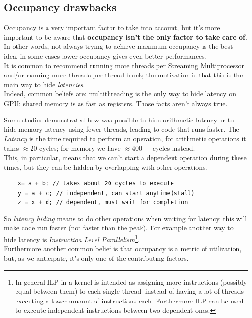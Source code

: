 \subsection{Occupancy drawbacks}
Occupancy is a very important factor to take into account, but it's more important to be aware that \textbf{occupancy isn't the only factor to take care of}.\\
In other words, not always trying to achieve maximum occupancy is the best idea, in some cases lower occupancy gives even better performances.\\
It is common to recommend running more threads per Streaming Multiprocessor and/or running more threads per thread block; the motivation is that this is the main way to hide \textit{latencies}.\\
Indeed, common beliefs are: multithreading is the only way to hide latency on GPU; shared memory is as fast as registers. Those facts aren't always true.

Some studies demonstrated how was possible to hide arithmetic latency or to hide memory latency using fewer threads, leading to code that runs faster.
The \textit{Latency} is the time required to perform an operation, for arithmetic operations it takes \(\approx20\) cycles; for memory we have \(\approx400+\) cycles instead.\\
This, in particular, means that  we can't start a dependent operation during these times, but they can be hidden by overlapping with other operations.

\begin{lstlisting}
	x= a + b; // takes about 20 cycles to execute
	y = a + c; // independent, can start anytime(stall)
	z = x + d; // dependent, must wait for completion
\end{lstlisting}
So \textit{latency hiding} means to do other operations when waiting for latency, this will make code run faster (not faster than the peak). For example another way to hide latency is \textit{Instruction Level Parallelism}\footnote{In general ILP in a kernel is intended as assigning more instructions (possibly equal between them) to each single thread, instead of having a lot of threads executing a lower amount of instructions each. Furthermore ILP can be used to execute independent instructions between two dependent ones\cite{perfoptimize}.}.\\
Furthermore another common belief is that occupancy is a metric of utilization, but, as we anticipate, it's only one of the contributing factors.

